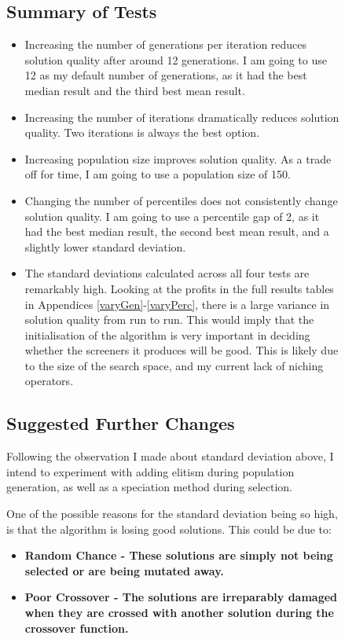 \begin{figure}
    \subsection{Summary of Tests}
    \begin{itemize}
        \item Increasing the number of generations per iteration reduces solution quality after around 12 generations. I am going to use 12 as my default number of generations, as it had the best median result and the third best mean result.
        \item Increasing the number of iterations dramatically reduces solution quality. Two iterations is always the best option.
        \item Increasing population size improves solution quality. As a trade off for time, I am going to use a population size of 150.
        \item Changing the number of percentiles does not consistently change solution quality. I am going to use a percentile gap of 2, as it had the best median result, the second best mean result, and a slightly lower standard deviation.
        \item The standard deviations calculated across all four tests are remarkably high. Looking at the profits in the full results tables in Appendices \ref{varyGen}-\ref{varyPerc}, there is a large variance in solution quality from run to run. This would imply that the initialisation of the algorithm is very important in deciding whether the screeners it produces will be good. This is likely due to the size of the search space, and my current lack of niching operators.
    \end{itemize}
    
    \subsection{Suggested Further Changes}
    Following the observation I made about standard deviation above, I intend to experiment with adding elitism during population generation, as well as a speciation method during selection. \newline
    
    One of the possible reasons for the standard deviation being so high, is that the algorithm is losing good solutions. This could be due to:
    \begin{itemize}
        \item \bf Random Chance \rm - These solutions are simply not being selected or are being mutated away.
        \item \bf Poor Crossover \rm - The solutions are irreparably damaged when they are crossed with another solution during the crossover function.
    \end{itemize}
    

\end{figure}
